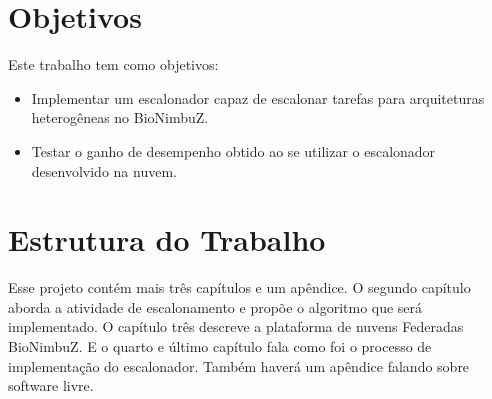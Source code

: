 \section{Objetivos}
Este trabalho tem como objetivos: 

\begin{itemize}
	\item Implementar um escalonador capaz de escalonar tarefas para arquiteturas heterogêneas no BioNimbuZ.
	\item Testar o ganho de desempenho obtido ao se utilizar o escalonador desenvolvido na nuvem.
\end{itemize}

\section{Estrutura do Trabalho}
Esse projeto contém mais três capítulos e um apêndice. O segundo capítulo aborda a atividade de escalonamento e propõe o algoritmo que será implementado. O capítulo três descreve a plataforma de nuvens Federadas BioNimbuZ. E o quarto e último capítulo fala como foi o processo de implementação do escalonador. Também haverá um apêndice falando sobre software livre.